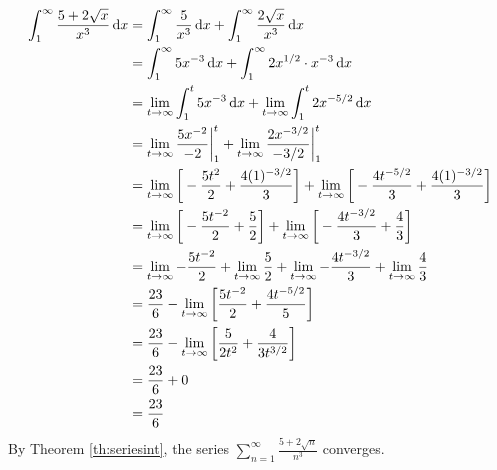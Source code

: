 \begin{ex}
\begin{sol}
    \begin{align*}
      \int_1^\infty \frac{5+2\sqrt x}{x^3} \,\mathrm{d} x
      &= \int_1^\infty \frac{5}{x^3} \,\mathrm{d} x
      + \int_1^\infty \frac{2 \sqrt x}{x^3} \,\mathrm{d} x \\
      &= \int_1^\infty 5x^{-3} \,\mathrm{d} x
      + \int_1^\infty 2x^{1/2} \cdot x^{-3} \,\mathrm{d} x \\
      &= \lim_{t\to\infty} \int_1^t 5x^{-3} \,\mathrm{d} x
      +  \lim_{t\to\infty}\int_1^t 2x^{-5/2} \,\mathrm{d} x \\
      &= \lim_{t\to\infty}\frac{5x^{-2}}{-2}\bigg|_1^t+
      \lim_{t\to\infty}\frac{2x^{-3/2}}{-3/2}\bigg|_1^t \\
      &= \lim_{t\to\infty} \bigg[-\frac{5t^{2}}{2}+\frac{4(1)^{-3/2}}{3} \bigg]
      + \lim_{t\to\infty}\bigg[ -\frac{4t^{-5/2}}{3} +\frac{4(1)^{-3/2}}{3}
        \bigg] \\
      &=\lim_{t\to\infty} \bigg[-\frac{5t^{-2}}{2}+\frac{5}{2} \bigg]
      + \lim_{t\to\infty}\bigg[ -\frac{4t^{-3/2}}{3} +\frac{4}{3}
        \bigg]\\
      &=\lim_{t\to\infty} -\frac{5t^{-2}}{2}+\lim_{t\to\infty} \frac{5}{2}
      + \lim_{t\to\infty} -\frac{4t^{-3/2}}{3} +\lim_{t\to\infty}\frac{4}{3} \\
      &=\frac{23}{6}-\lim_{t\to\infty}\bigg[
        \frac{5t^{-2}}{2}+\frac{4t^{-5/2}}{5} \bigg] \\
      &=\frac{23}{6}-\lim_{t\to\infty}\bigg[
        \frac{5}{2t^2}+\frac{4}{3t^{3/2}} \bigg]\\
        &=\frac{23}{6}+0 \\
        &= \frac{23}{6}
    \end{align*}
    By Theorem \ref{th:seriesint}, the series
    \( \sum_{n=1}^{\infty} \frac{5+2\sqrt n}{n^3} \)
    converges.
  \end{sol}
\end{ex}
